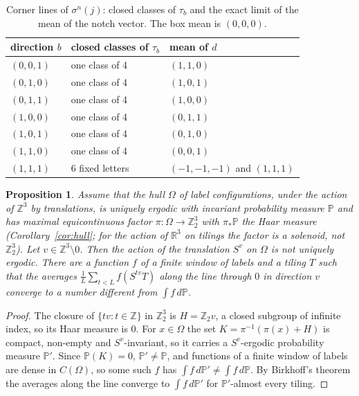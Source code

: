 \documentclass[11pt]{article}
\newtheorem{prop}{Proposition}
\theoremstyle{definition}
\theoremstyle{remark}
\begin{document}
\begin{table}[ht]
\centering
\caption{Corner lines of $\sigma^{n}(j)$: closed classes of $\tau_{b}$ and the exact limit of the mean of the notch vector.  The
box mean is $(0,0,0)$.}
\label{tab:corner}
\begin{tabular}{lll}
direction $b$ & closed classes of $\tau_{b}$ & mean of $d$ \\ \hline
$(0,0,1)$ & one class of 4 & $(1,1,0)$ \\
$(0,1,0)$ & one class of 4 & $(1,0,1)$ \\
$(0,1,1)$ & one class of 4 & $(1,0,0)$ \\
$(1,0,0)$ & one class of 4 & $(0,1,1)$ \\
$(1,0,1)$ & one class of 4 & $(0,1,0)$ \\
$(1,1,0)$ & one class of 4 & $(0,0,1)$ \\
$(1,1,1)$ & 6 fixed letters & $(-1,-1,-1)$ and $(1,1,1)$ \\
\end{tabular}
\end{table}

\begin{prop}
\label{prop:lineaction}
Assume that the hull $\Omega$ of label configurations, under the action of $\mathbb{Z}^{3}$ by translations, is uniquely
ergodic with invariant probability measure $\mathbb{P}$ and has maximal
equicontinuous factor $\pi:\Omega\to\mathbb{Z}_{2}^{3}$ with $\pi_{*}\mathbb{P}$ the Haar measure (Corollary~\ref{cor:hull}; for the
action of $\mathbb{R}^{3}$ on tilings the factor is a solenoid, not $\mathbb{Z}_{2}^{3}$).  Let $v\in\mathbb{Z}^{3}\setminus0$.  Then the action of the translation $S^{v}$ on $\Omega$ is
not uniquely ergodic.  There are a function $f$ of a finite window of labels and a tiling $T$ such that the averages
$\frac1L\sum_{t<L}f(S^{tv}T)$ along the line through $0$ in direction $v$ converge to a number different from $\int f\,d\mathbb{P}$.
\end{prop}

\begin{proof}
The closure of $\{tv:t\in\mathbb{Z}\}$ in $\mathbb{Z}_{2}^{3}$ is $H=\mathbb{Z}_{2}v$, a closed subgroup of infinite index, so its
Haar measure is $0$.  For $x\in\Omega$ the set $K=\pi^{-1}(\pi(x)+H)$ is compact, non-empty and $S^{v}$-invariant, so it carries a
$S^{v}$-ergodic probability measure $\mathbb{P}'$.  Since $\mathbb{P}(K)=0$, $\mathbb{P}'\neq\mathbb{P}$, and functions of a finite window of labels are dense
in $C(\Omega)$, so some such $f$ has $\int f\,d\mathbb{P}'\ne\int f\,d\mathbb{P}$.  By Birkhoff's theorem the averages along the line converge to
$\int f\,d\mathbb{P}'$ for $\mathbb{P}'$-almost every tiling.
\end{proof}
\end{document}
